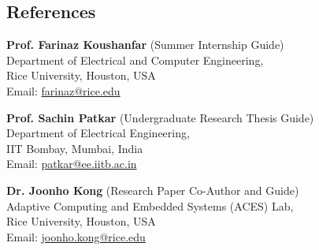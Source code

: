 \documentclass[margin,line]{resume}
\begin{document}
\begin{resume}
\section{\mysidestyle References}
	\begin{list1}
    
	\item \textbf{Prof. Farinaz Koushanfar} (Summer Internship Guide)\\
	Department of Electrical and Computer Engineering,\\
	Rice University, Houston, USA\\
	Email: \url {farinaz@rice.edu}\\

	\item \textbf{Prof. Sachin Patkar} (Undergraduate Research Thesis Guide)\\
	Department of Electrical Engineering,\\
	IIT Bombay, Mumbai, India\\
	Email: \url {patkar@ee.iitb.ac.in}\\

	\item \textbf{Dr. Joonho Kong} (Research Paper Co-Author and Guide)\\
	Adaptive Computing and Embedded Systems (ACES) Lab,\\
	Rice University, Houston, USA\\
	Email: \url{joonho.kong@rice.edu}\\
    
	\end{list1}
\end{resume}
\end{document}
